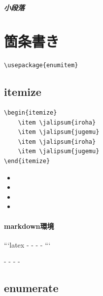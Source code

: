 \documentclass[article, head_space=25truemm, foot_space=15truemm, gutter=15truemm]{jlreq}
\begin{document}

\subparagraph{小段落}






\section{箇条書き}

\begin{verbatim}
\usepackage{enumitem}
\end{verbatim}

\subsection{itemize}

\begin{verbatim}
\begin{itemize}
    \item \jalipsum{iroha}
    \item \jalipsum{jugemu}
    \item \jalipsum{iroha}
    \item \jalipsum{jugemu}
\end{itemize}
\end{verbatim}

\begin{itemize}
    \item {}
    \item {}
    \item {}
    \item {}
\end{itemize}

\paragraph{markdown環境}

\begin{markdown}
```latex
- 
- 
- 
- 
```
\end{markdown}

\begin{markdown}
- 
- 
- 
- 
\end{markdown}

\subsection{enumerate}
\end{document}
